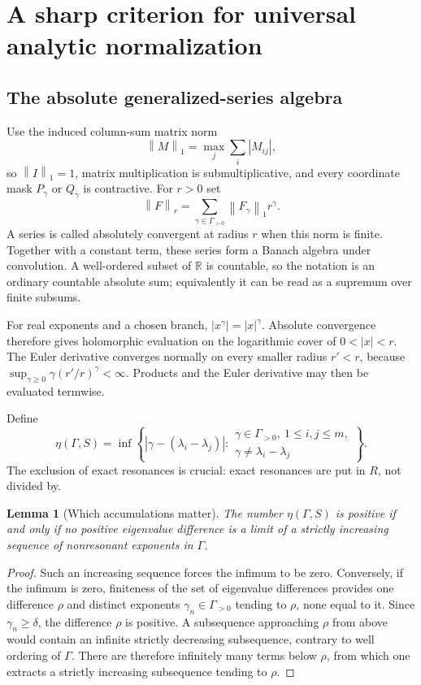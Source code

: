 \documentclass[11pt,a4paper]{article}
\numberwithin{equation}{section}
\newtheorem{lemma}[theorem]{Lemma}
\theoremstyle{definition}
\theoremstyle{remark}
\newcommand{\R}{\mathbb R}
\newcommand{\G}{\Gamma}
\newcommand{\norm}[1]{\left\lVert #1\right\rVert}
\begin{document}
\section{A sharp criterion for universal analytic normalization}
\label{sec:analytic}

\subsection{The absolute generalized-series algebra}
Use the induced column-sum matrix norm
\[
 \norm{M}_1=\max_j\sum_i|M_{ij}|,
\]
so $\norm I_1=1$, matrix multiplication is submultiplicative, and every
coordinate mask $P_\gamma$ or $Q_\gamma$ is contractive. For $r>0$ set
\begin{equation}\label{eq:analytic-norm}
 \norm F_r=\sum_{\gamma\in\G_{>0}}\norm{F_\gamma}_1r^\gamma.
\end{equation}
A series is called absolutely convergent at radius $r$ when this norm is
finite. Together with a constant term, these series form a Banach algebra
under convolution. A well-ordered subset of $\R$ is countable, so the
notation is an ordinary countable absolute sum; equivalently it can be
read as a supremum over finite subsums.

For real exponents and a chosen branch, $|x^\gamma|=|x|^\gamma$.
Absolute convergence therefore gives holomorphic evaluation on the
logarithmic cover of $0<|x|<r$. The Euler derivative converges normally on
every smaller radius $r'<r$, because
$\sup_{\gamma\geq0}\gamma(r'/r)^\gamma<\infty$. Products and the
Euler derivative may then be evaluated termwise.

Define
\begin{equation}\label{eq:eta}
 \eta(\G,S)=
 \inf\left\{
 |\gamma-(\lambda_i-\lambda_j)|:
 \begin{array}{l}
 \gamma\in\G_{>0},\ 1\leq i,j\leq m,\\[-2pt]
 \gamma\ne\lambda_i-\lambda_j
 \end{array}\right\}.
\end{equation}
The exclusion of exact resonances is crucial: exact resonances are put in
$R$, not divided by.

\begin{lemma}[Which accumulations matter]\label{lem:gap}
The number $\eta(\G,S)$ is positive if and only if no positive
eigenvalue difference is a limit of a strictly increasing sequence of
nonresonant exponents in $\G$.
\end{lemma}
\begin{proof}
Such an increasing sequence forces the infimum to be zero. Conversely,
if the infimum is zero, finiteness of the set of eigenvalue differences
provides one difference $\rho$ and distinct exponents
$\gamma_n\in\G_{>0}$ tending to $\rho$, none equal to it. Since
$\gamma_n\geq\delta$, the difference $\rho$ is positive. A subsequence
approaching $\rho$ from above would contain an infinite strictly decreasing
subsequence, contrary to well ordering of $\G$. There are therefore
infinitely many terms below $\rho$, from which one extracts a strictly
increasing subsequence tending to $\rho$.
\end{proof}
\end{document}
